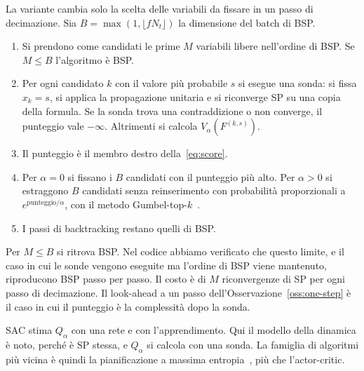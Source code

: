 La variante cambia solo la scelta delle variabili da fissare in un passo di decimazione.
Sia $B=\max(1,\lfloor fN_t\rfloor)$ la dimensione del batch di BSP.
\begin{enumerate}
\item Si prendono come candidati le prime $M$ variabili libere nell'ordine di BSP. Se $M\le B$ l'algoritmo è BSP.
\item Per ogni candidato $k$ con il valore più probabile $s$ si esegue una sonda: si fissa $x_k=s$, si applica la propagazione unitaria e si riconverge SP su una copia della formula. Se la sonda trova una contraddizione o non converge, il punteggio vale $-\infty$. Altrimenti si calcola $V_\alpha(F^{(k,s)})$.
\item Il punteggio è il membro destro della~\eqref{eq:score}.
\item Per $\alpha=0$ si fissano i $B$ candidati con il punteggio più alto. Per $\alpha>0$ si estraggono $B$ candidati senza reinserimento con probabilità proporzionali a $e^{\text{punteggio}/\alpha}$, con il metodo Gumbel-top-$k$~\citep{kool2019stochastic}.
\item I passi di backtracking restano quelli di BSP.
\end{enumerate}
Per $M\le B$ si ritrova BSP.
Nel codice abbiamo verificato che questo limite, e il caso in cui le sonde vengono eseguite ma l'ordine di BSP viene mantenuto, riproducono BSP passo per passo.
Il costo è di $M$ riconvergenze di SP per ogni passo di decimazione.
Il look-ahead a un passo dell'Osservazione~\ref{oss:one-step} è il caso in cui il punteggio è la complessità dopo la sonda.

SAC stima $Q_\alpha$ con una rete e con l'apprendimento.
Qui il modello della dinamica è noto, perché è SP stessa, e $Q_\alpha$ si calcola con una sonda.
La famiglia di algoritmi più vicina è quindi la pianificazione a massima entropia~\citep{xiao2019maximum}, più che l'actor-critic.
